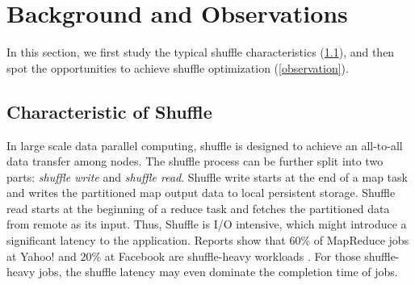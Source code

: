 \section{Background and Observations}\label{motivation}

In this section, we first study the typical shuffle characteristics (\ref{shuffle pattern}), and then spot the opportunities to achieve shuffle optimization (\ref{observation}).
\subsection{Characteristic of Shuffle} \label{shuffle pattern}

{\color{black}
In large scale data parallel computing, shuffle is designed to achieve an all-to-all data transfer among nodes.
The shuffle process can be further split into two parts: \textit{shuffle write} and \textit{shuffle read}. 
Shuffle write starts at the end of a map task and writes the partitioned map output data to local persistent storage. 
Shuffle read starts at the beginning of a reduce task and fetches the partitioned data from remote as its input.
Thus, Shuffle is I/O intensive, which might introduce a significant latency to the application. 
Reports show that $60\%$ of MapReduce jobs at Yahoo! and $20\%$ at Facebook are shuffle-heavy workloads \cite{shufflewatcher}. 
For those shuffle-heavy jobs, the shuffle latency may even dominate the completion time of jobs.
}



